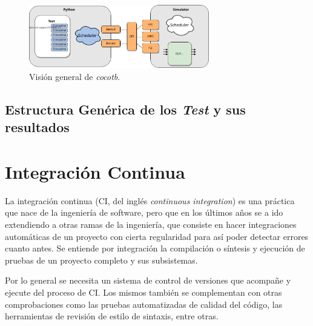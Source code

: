 \begin{figure}[h]
  \centering
  \includegraphics[width=0.7\textwidth]{./Figures/cocotb_overview.png}
  \caption{Visión general de \textit{cocotb}.}
\end{figure}


\subsection{Estructura Genérica de los \textit{Test} y sus resultados}



\section{Integración Continua}

La integración continua (CI, del inglés \textit{continuous integration}) es una
práctica que nace de la ingeniería de software, pero que en los últimos años se
a ido extendiendo a otras ramas de la ingeniería, que consiste en hacer
integraciones automáticas de un proyecto con cierta regularidad para así poder
detectar errores cuanto antes. Se entiende por integración la compilación o
síntesis y ejecución de pruebas de un proyecto completo y sus subsistemas. 

Por lo general se necesita un sistema de control de versiones que acompañe y
ejecute del proceso de CI\@. Los mismos también se complementan con otras
comprobaciones como las pruebas automatizadas de calidad del código, las
herramientas de revisión de estilo de sintaxis, entre otras.

